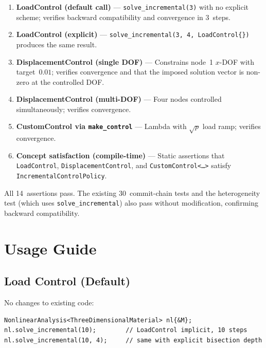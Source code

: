 \begin{enumerate}
  \item \textbf{LoadControl (default call)} ---
        \texttt{solve\_incremental(3)} with no explicit scheme;
        verifies backward compatibility and convergence in 3~steps.

  \item \textbf{LoadControl (explicit)} ---
        \texttt{solve\_incremental(3, 4, LoadControl\{\})} produces
        the same result.

  \item \textbf{DisplacementControl (single DOF)} ---
        Constrains node~1 $x$-DOF with target~$0.01$; verifies
        convergence and that the imposed solution vector is non-zero
        at the controlled DOF.

  \item \textbf{DisplacementControl (multi-DOF)} ---
        Four nodes controlled simultaneously; verifies convergence.

  \item \textbf{CustomControl via \texttt{make\_control}} ---
        Lambda with $\sqrt{p}$ load ramp; verifies convergence.

  \item \textbf{Concept satisfaction (compile-time)} ---
        Static assertions that \texttt{LoadControl},
        \texttt{DisplacementControl}, and
        \texttt{CustomControl<\ldots>} satisfy
        \texttt{IncrementalControlPolicy}.
\end{enumerate}

All 14~assertions pass.  The existing 30~commit-chain tests and the
heterogeneity test (which uses \texttt{solve\_incremental}) also pass
without modification, confirming backward compatibility.

\section{Usage Guide}
\label{sec:ic-usage}

\subsection{Load Control (Default)}

No changes to existing code:

\begin{lstlisting}
NonlinearAnalysis<ThreeDimensionalMaterial> nl{&M};
nl.solve_incremental(10);        // LoadControl implicit, 10 steps
nl.solve_incremental(10, 4);     // same with explicit bisection depth
\end{lstlisting}

